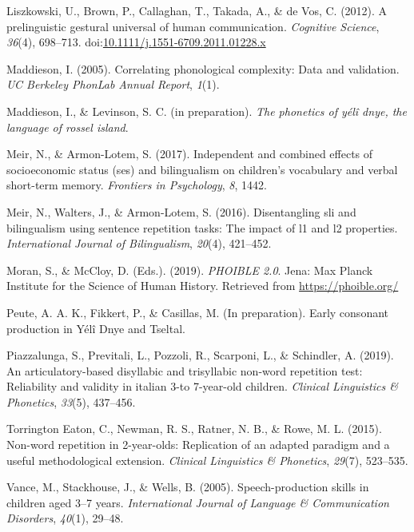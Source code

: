 \documentclass[english,,man,floatsintext]{apa6}
\begin{document}
\hypertarget{ref-liszkowski2012prelinguistic}{}
Liszkowski, U., Brown, P., Callaghan, T., Takada, A., \& de Vos, C.
(2012). A prelinguistic gestural universal of human communication.
\emph{Cognitive Science}, \emph{36}(4), 698--713.
doi:\href{https://doi.org/10.1111/j.1551-6709.2011.01228.x}{10.1111/j.1551-6709.2011.01228.x}

\hypertarget{ref-maddieson2005correlating}{}
Maddieson, I. (2005). Correlating phonological complexity: Data and
validation. \emph{UC Berkeley PhonLab Annual Report}, \emph{1}(1).

\hypertarget{ref-maddiesonIPphoneticsYD}{}
Maddieson, I., \& Levinson, S. C. (in preparation). \emph{The phonetics
of yélî dnye, the language of rossel island}.

\hypertarget{ref-meir2017independent}{}
Meir, N., \& Armon-Lotem, S. (2017). Independent and combined effects of
socioeconomic status (ses) and bilingualism on children's vocabulary and
verbal short-term memory. \emph{Frontiers in Psychology}, \emph{8},
1442.

\hypertarget{ref-meir2016disentangling}{}
Meir, N., Walters, J., \& Armon-Lotem, S. (2016). Disentangling sli and
bilingualism using sentence repetition tasks: The impact of l1 and l2
properties. \emph{International Journal of Bilingualism}, \emph{20}(4),
421--452.

\hypertarget{ref-phoible}{}
Moran, S., \& McCloy, D. (Eds.). (2019). \emph{PHOIBLE 2.0}. Jena: Max
Planck Institute for the Science of Human History. Retrieved from
\url{https://phoible.org/}

\hypertarget{ref-peuteIPconsonants}{}
Peute, A. A. K., Fikkert, P., \& Casillas, M. (In preparation). Early
consonant production in Yélî Dnye and Tseltal.

\hypertarget{ref-piazzalunga2019articulatory}{}
Piazzalunga, S., Previtali, L., Pozzoli, R., Scarponi, L., \& Schindler,
A. (2019). An articulatory-based disyllabic and trisyllabic non-word
repetition test: Reliability and validity in italian 3-to 7-year-old
children. \emph{Clinical Linguistics \& Phonetics}, \emph{33}(5),
437--456.

\hypertarget{ref-torrington2015non}{}
Torrington Eaton, C., Newman, R. S., Ratner, N. B., \& Rowe, M. L.
(2015). Non-word repetition in 2-year-olds: Replication of an adapted
paradigm and a useful methodological extension. \emph{Clinical
Linguistics \& Phonetics}, \emph{29}(7), 523--535.

\hypertarget{ref-vance2005speech}{}
Vance, M., Stackhouse, J., \& Wells, B. (2005). Speech-production skills
in children aged 3--7 years. \emph{International Journal of Language \&
Communication Disorders}, \emph{40}(1), 29--48.
\end{document}
